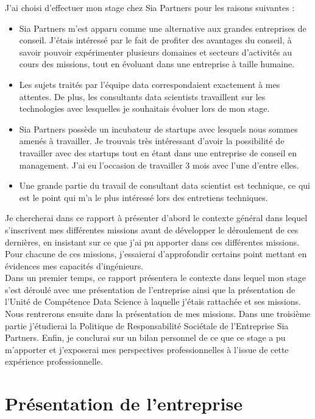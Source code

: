 \documentclass{article} %
\begin{document}
\noindent J’ai choisi d’effectuer mon stage chez Sia Partners pour les raisons suivantes :
\begin{itemize}
	\item Sia Partners m’est apparu comme une alternative aux grandes entreprises de conseil. J’étais intéressé par le fait de profiter des avantages du conseil, à savoir pouvoir expérimenter plusieurs domaines et secteurs d’activités au cours des missions, tout en évoluant dans une entreprise à taille humaine.
	\item Les sujets traités par l’équipe data correspondaient exactement à mes
	attentes. De plus, les consultants data scientists travaillent sur les technologies
	avec lesquelles je souhaitais évoluer lors de mon stage. 
	\item Sia Partners possède un incubateur de startups avec lesquels nous
	sommes amenés à travailler. Je trouvais très intéressant d’avoir la possibilité
	de travailler avec des startups tout en étant dans une entreprise de conseil en
	management. J'ai eu l'occasion de travailler 3 mois avec l'une d'entre elles. 
	\item Une grande partie du travail de consultant data scientist est technique, ce qui est le point qui m'a le plus intéressé lors des entretiens techniques.
\end{itemize}

Je chercherai dans ce rapport à présenter d'abord le contexte général dans lequel s'inscrivent mes différentes missions avant de développer le déroulement de ces dernières, en insistant sur ce que j’ai pu apporter dans ces différentes missions. Pour chacune de ces missions, j’essaierai d'approfondir certains point mettant en évidences mes capacités d'ingénieurs.\\

Dans un premier temps, ce rapport présentera le contexte dans lequel mon stage s’est déroulé avec une présentation de l’entreprise ainsi que la présentation de l’Unité de Compétence Data Science à laquelle j’étais rattachée et ses missions. Nous rentrerons ensuite dans la présentation de mes missions. Dans une troisième partie j’étudierai la Politique de Responsabilité Sociétale de l’Entreprise Sia Partners. Enfin, je conclurai sur un bilan personnel de ce que ce stage a pu m’apporter et j’exposerai mes perspectives professionnelles à l’issue de cette expérience professionnelle.


\newpage

\section{Présentation de l'entreprise}
\end{document}
